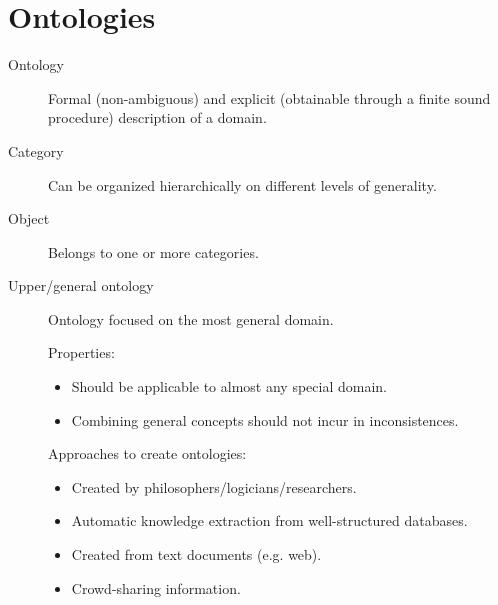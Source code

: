\chapter{Ontologies}

\begin{description}
    \item[Ontology]  
        Formal (non-ambiguous) and explicit (obtainable through a finite sound procedure) 
        description of a domain.

    \item[Category] 
        Can be organized hierarchically on different levels of generality.

    \item[Object] 
        Belongs to one or more categories.

    \item[Upper/general ontology]  
        Ontology focused on the most general domain.

        Properties:
        \begin{itemize}
            \item Should be applicable to almost any special domain.
            \item Combining general concepts should not incur in inconsistences.
        \end{itemize}

        Approaches to create ontologies:
        \begin{itemize}
            \item Created by philosophers/logicians/researchers.
            \item Automatic knowledge extraction from well-structured databases.
            \item Created from text documents (e.g. web).
            \item Crowd-sharing information.
        \end{itemize}
\end{description}


